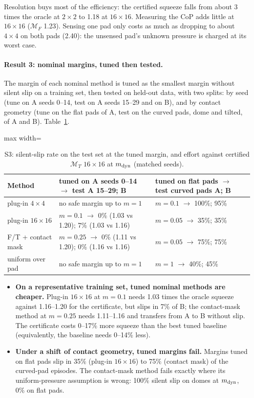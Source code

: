 \documentclass[11pt,a4paper]{article}
\newcommand{\M}{\mathcal M}
\begin{document}
Resolution buys most of the efficiency: the certified squeeze falls from about 3 times the oracle at $2\times2$ to 1.18 at $16\times16$. Measuring the CoP
adds little at $16\times16$ ($\M_F$ 1.23). Sensing one pad only costs as much as dropping to about $4\times4$ on both pads (2.40): the unsensed pad's
unknown pressure is charged at its worst case.

\paragraph{Result 3: nominal margins, tuned then tested.} The margin of each nominal method is tuned as the smallest margin without silent slip on a
training set, then tested on held-out data, with two splits: by seed (tune on A seeds 0--14, test on A seeds 15--29 and on B), and by contact
geometry (tune on the flat pads of A, test on the curved pads, dome and tilted, of A and B). Table~\ref{tab:S3tuned}.

\begin{table}[tbp]
\centering\small
\begin{adjustbox}{max width=\linewidth}\begin{tabular}{@{}lll@{}}
\toprule
Method & tuned on A seeds 0--14 $\to$ test A 15--29; B & tuned on flat pads $\to$ test curved pads A; B \\
\midrule
plug-in $4\times4$ & no safe margin up to $m=1$ & $m=0.1$ $\to$ 100\%; 95\% \\
plug-in $16\times16$ & $m=0.1$ $\to$ 0\% (1.03 vs 1.20); 7\% (1.03 vs 1.16) & $m=0.05$ $\to$ 35\%; 35\% \\
F/T + contact mask & $m=0.25$ $\to$ 0\% (1.11 vs 1.20); 0\% (1.16 vs 1.16) & $m=0.05$ $\to$ 75\%; 75\% \\
uniform over pad & no safe margin up to $m=1$ & $m=1$ $\to$ 40\%; 45\% \\
\bottomrule
\end{tabular}\end{adjustbox}
\caption{S3: silent-slip rate on the test set at the tuned margin, and effort against certified $\M_T$ $16\times16$ at $m_{\rm dyn}$ (matched seeds).}
\label{tab:S3tuned}
\end{table}

\begin{itemize}
    \item \textbf{On a representative training set, tuned nominal methods are cheaper.} Plug-in $16\times16$ at $m=0.1$ needs 1.03 times the oracle
    squeeze against 1.16--1.20 for the certificate, but slips in 7\% of B; the contact-mask method at $m=0.25$ needs 1.11--1.16 and transfers from
    A to B without slip. The certificate costs 0--17\% more squeeze than the best tuned baseline (equivalently, the baseline needs 0--14\% less).
    \item \textbf{Under a shift of contact geometry, tuned margins fail.} Margins tuned on flat pads slip in 35\% (plug-in $16\times16$) to 75\%
    (contact mask) of the curved-pad episodes. The contact-mask method fails exactly where its uniform-pressure assumption is wrong: 100\% silent
    slip on domes at $m_{\rm dyn}$, 0\% on flat pads.
\end{itemize}
\end{document}
